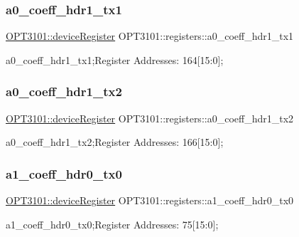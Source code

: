 \subsubsection{\texorpdfstring{a0\+\_\+coeff\+\_\+hdr1\+\_\+tx1}{a0\_coeff\_hdr1\_tx1}}
{\footnotesize\ttfamily \mbox{\hyperlink{class_o_p_t3101_1_1device_register}{O\+P\+T3101\+::device\+Register}} O\+P\+T3101\+::registers\+::a0\+\_\+coeff\+\_\+hdr1\+\_\+tx1}



a0\+\_\+coeff\+\_\+hdr1\+\_\+tx1;Register Addresses\+: 164\mbox{[}15\+:0\mbox{]}; 

\mbox{\label{class_o_p_t3101_1_1registers_abbec983e74f5790b541e49432c9e5765}} 
\subsubsection{\texorpdfstring{a0\+\_\+coeff\+\_\+hdr1\+\_\+tx2}{a0\_coeff\_hdr1\_tx2}}
{\footnotesize\ttfamily \mbox{\hyperlink{class_o_p_t3101_1_1device_register}{O\+P\+T3101\+::device\+Register}} O\+P\+T3101\+::registers\+::a0\+\_\+coeff\+\_\+hdr1\+\_\+tx2}



a0\+\_\+coeff\+\_\+hdr1\+\_\+tx2;Register Addresses\+: 166\mbox{[}15\+:0\mbox{]}; 

\mbox{\label{class_o_p_t3101_1_1registers_aef8ec6287aba1f316f417cb1b5fb2250}} 
\subsubsection{\texorpdfstring{a1\+\_\+coeff\+\_\+hdr0\+\_\+tx0}{a1\_coeff\_hdr0\_tx0}}
{\footnotesize\ttfamily \mbox{\hyperlink{class_o_p_t3101_1_1device_register}{O\+P\+T3101\+::device\+Register}} O\+P\+T3101\+::registers\+::a1\+\_\+coeff\+\_\+hdr0\+\_\+tx0}



a1\+\_\+coeff\+\_\+hdr0\+\_\+tx0;Register Addresses\+: 75\mbox{[}15\+:0\mbox{]}; 

